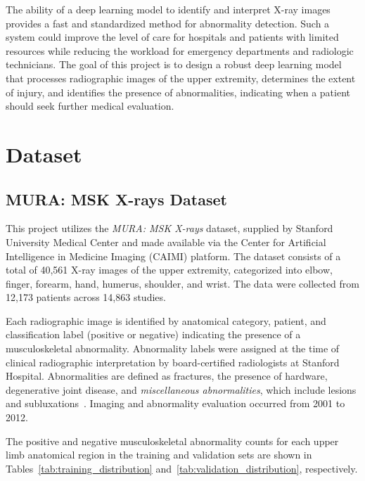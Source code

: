 \documentclass[conference]{IEEEtran}
\begin{document}
The ability of a deep learning model to identify and interpret X-ray images provides a fast and standardized method for abnormality detection. Such a system could improve the level of care for hospitals and patients with limited resources while reducing the workload for emergency departments and radiologic technicians. The goal of this project is to design a robust deep learning model that processes radiographic images of the upper extremity, determines the extent of injury, and identifies the presence of abnormalities, indicating when a patient should seek further medical evaluation.

\section{Dataset}


\subsection{MURA: MSK X-rays Dataset}

This project utilizes the \textit{MURA: MSK X-rays} dataset, supplied by Stanford University Medical Center and made available via the Center for Artificial Intelligence in Medicine Imaging (CAIMI) platform. The dataset consists of a total of 40{,}561 X-ray images of the upper extremity, categorized into elbow, finger, forearm, hand, humerus, shoulder, and wrist. The data were collected from 12{,}173 patients across 14{,}863 studies.

Each radiographic image is identified by anatomical category, patient, and classification label (positive or negative) indicating the presence of a musculoskeletal abnormality. Abnormality labels were assigned at the time of clinical radiographic interpretation by board-certified radiologists at Stanford Hospital. Abnormalities are defined as fractures, the presence of hardware, degenerative joint disease, and \textit{miscellaneous abnormalities}, which include lesions and subluxations~\cite{rajpurkar2018mura}. Imaging and abnormality evaluation occurred from 2001 to 2012.

The positive and negative musculoskeletal abnormality counts for each upper limb anatomical region in the training and validation sets are shown in Tables~\ref{tab:training_distribution} and~\ref{tab:validation_distribution}, respectively.
\end{document}
